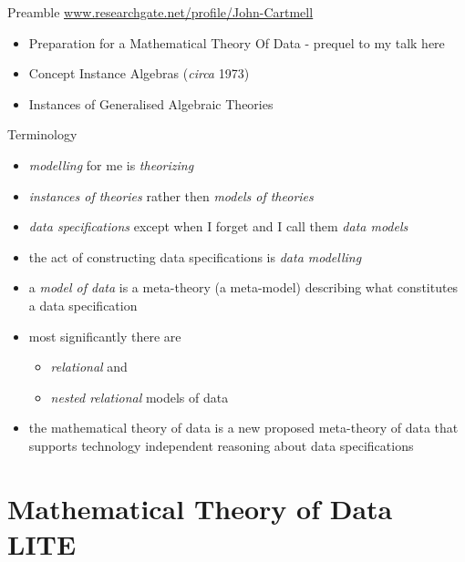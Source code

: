 \begin{frame}
\titlepage
{}
\end{frame}

\iffalse   

\begin{frame}{Preamble}
\underline{\url{www.researchgate.net/profile/John-Cartmell}}
\medskip
\begin{itemize}
\item Preparation for a Mathematical Theory Of Data - prequel to my talk here
\pause \item Concept Instance Algebras (\textit{circa} 1973)
\pause \item Instances of Generalised Algebraic Theories 
\end{itemize}
\end{frame}

\begin{frame}{Terminology}
\begin{itemize}
\item \textit{modelling} for me is \textit{theorizing}
\item \textit{instances of theories}  rather then \textit{models of theories}
\item \textit{data specifications} except when I forget and I call them \textit{data models}
\item the act of constructing data specifications is \textit{data modelling}
\item a \textit{model of data} is a meta-theory (a meta-model) describing what constitutes a data specification 
\item most significantly there are
\begin{itemize}
\item \textit{relational} and 
\item \textit{nested relational} 
models of data
\end{itemize}
\item the mathematical theory of data is a new proposed meta-theory of data that supports technology  independent reasoning about data specifications
\end{itemize}
\end{frame}

\section{Mathematical Theory of Data LITE}

